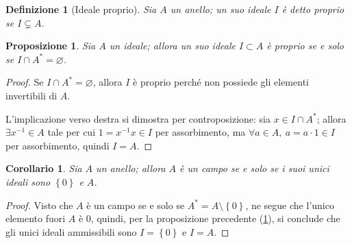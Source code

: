 \documentclass[11pt]{article}
\theoremstyle{style}
\newtheorem{definizione}{Definizione}[section]
\newtheorem{prop}{Proposizione}[section]
\newtheorem{corollario}{Corollario}[teorema]
\numberwithin{equation}{subsection}
\begin{document}
\begin{definizione}
	[Ideale proprio]
	Sia $A$ un anello; un suo ideale $I$ \`e detto \textit{proprio} se $I \subsetneq A$.
\end{definizione}
\begin{prop}\label{idprop}
	Sia $A$ un ideale; allora un suo ideale $I \subset A$ \`e proprio se e solo se $I \cap A^* = \varnothing$.
\end{prop}
	\begin{proof}
		Se $I\cap A^* = \varnothing$, allora $I$ \`e proprio perch\'e non possiede gli elementi invertibili di $A$.

		L'implicazione verso destra si dimostra per controposizione: sia $x \in I\cap A^*$; allora $\exists x^{-1}\in A$ tale per cui $1=x^{-1}x \in I$ per assorbimento, ma $\forall a \in A, \ a = a \cdot 1 \in I$ per assorbimento, quindi $I=A$.
	\end{proof}
\begin{corollario}
	Sia $A$ un anello; allora $A$ \`e un campo se e solo se i suoi unici ideali sono $\left\{ 0 \right\} $ e $A$.
\end{corollario}
	\begin{proof}
		Visto che $A$ \`e un campo se e solo se $A^* = A \setminus\left\{ 0 \right\} $, ne segue che l'unico elemento fuori $A$ \`e $0$, quindi, per la proposizione precedente (\ref{idprop}), si conclude che gli unici ideali ammissibili sono $I=\left\{ 0 \right\} $ e $I=A$.
	\end{proof}
\end{document}
